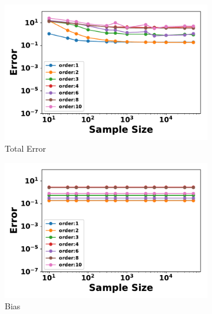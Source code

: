 \documentclass[letterpaper]{article} %
\begin{document}
        \begin{figure}[t]
          \centering
          \begin{subfigure}[b]{0.33\textwidth}
              \centering
              \includegraphics[width=\textwidth]{./HBM_Total_Error_Selected-eps-converted-to.pdf}
              \caption{Total Error}
          \end{subfigure}
          \begin{subfigure}[b]{0.33\textwidth}
              \centering
              \includegraphics[width=\textwidth]{./HBM_Bias_Selected-eps-converted-to.pdf}
              \caption{Bias}
          \end{subfigure}
          \begin{subfigure}[b]{0.33\textwidth}
              \centering

\end{subfigure}
\end{figure}
\end{document}
